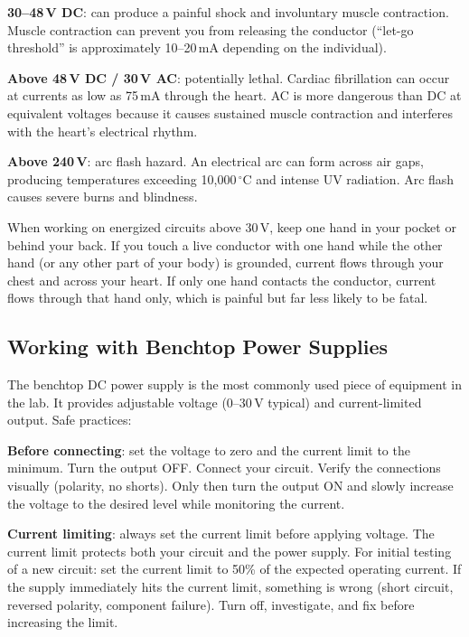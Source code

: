 \documentclass[11pt,letterpaper,twoside,openany]{book}
\newcommand{\degC}{\ensuremath{{}^{\circ}\text{C}}}
\begin{document}
\textbf{30--48\,V DC}: can produce a painful shock and involuntary muscle contraction. Muscle contraction can prevent you from releasing the conductor (``let-go threshold'' is approximately 10--20\,mA depending on the individual).

\textbf{Above 48\,V DC / 30\,V AC}: potentially lethal. Cardiac fibrillation can occur at currents as low as 75\,mA through the heart. AC is more dangerous than DC at equivalent voltages because it causes sustained muscle contraction and interferes with the heart's electrical rhythm.

\textbf{Above 240\,V}: arc flash hazard. An electrical arc can form across air gaps, producing temperatures exceeding 10{,}000\,\degC{} and intense UV radiation. Arc flash causes severe burns and blindness.

\begin{warningbox}
When working on energized circuits above 30\,V, keep one hand in your pocket or behind your back. If you touch a live conductor with one hand while the other hand (or any other part of your body) is grounded, current flows through your chest and across your heart. If only one hand contacts the conductor, current flows through that hand only, which is painful but far less likely to be fatal.
\end{warningbox}

\subsection*{Working with Benchtop Power Supplies}
The benchtop DC power supply is the most commonly used piece of equipment in the lab. It provides adjustable voltage (0--30\,V typical) and current-limited output. Safe practices:

\textbf{Before connecting}: set the voltage to zero and the current limit to the minimum. Turn the output OFF. Connect your circuit. Verify the connections visually (polarity, no shorts). Only then turn the output ON and slowly increase the voltage to the desired level while monitoring the current.

\textbf{Current limiting}: always set the current limit before applying voltage. The current limit protects both your circuit and the power supply. For initial testing of a new circuit: set the current limit to 50\% of the expected operating current. If the supply immediately hits the current limit, something is wrong (short circuit, reversed polarity, component failure). Turn off, investigate, and fix before increasing the limit.
\end{document}
